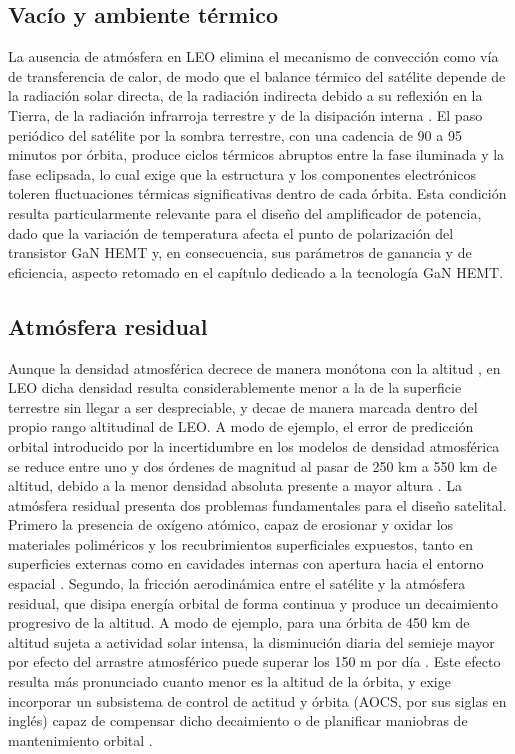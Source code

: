 \subsection{Vacío y ambiente térmico}
La ausencia de atmósfera en LEO elimina el mecanismo de convección como vía de transferencia de calor, de modo que el balance térmico del satélite depende de la radiación solar directa, de la radiación indirecta debido a su reflexión en la Tierra, de la radiación infrarroja terrestre y de la disipación interna \cite{gaite2007}. El paso periódico del satélite por la sombra terrestre, con una cadencia de 90 a 95 minutos por órbita, produce ciclos térmicos abruptos entre la fase iluminada y la fase eclipsada, lo cual exige que la estructura y los componentes electrónicos toleren fluctuaciones térmicas significativas dentro de cada órbita. Esta condición resulta particularmente relevante para el diseño del amplificador de potencia, dado que la variación de temperatura afecta el punto de polarización del transistor GaN HEMT y, en consecuencia, sus parámetros de ganancia y de eficiencia, aspecto retomado en el capítulo dedicado a la tecnología GaN HEMT.

\subsection{Atmósfera residual}
Aunque la densidad atmosférica decrece de manera monótona con la altitud \cite{benson2021}, en LEO dicha densidad resulta considerablemente menor a la de la superficie terrestre sin llegar a ser despreciable, y decae de manera marcada dentro del propio rango altitudinal de LEO. A modo de ejemplo, el error de predicción orbital introducido por la incertidumbre en los modelos de densidad atmosférica se reduce entre uno y dos órdenes de magnitud al pasar de 250 km a 550 km de altitud, debido a la menor densidad absoluta presente a mayor altura \cite{ray2022vleo}. La atmósfera residual presenta dos problemas fundamentales para el diseño satelital. Primero la presencia de oxígeno atómico, capaz de erosionar y oxidar los materiales poliméricos y los recubrimientos superficiales expuestos, tanto en superficies externas como en cavidades internas con apertura hacia el entorno espacial \cite{banks2003}. Segundo, la fricción aerodinámica entre el satélite y la atmósfera residual, que disipa energía orbital de forma continua y produce un decaimiento progresivo de la altitud. A modo de ejemplo, para una órbita de 450 km de altitud sujeta a actividad solar intensa, la disminución diaria del semieje mayor por efecto del arrastre atmosférico puede superar los 150 m por día \cite{thomassin2017}. Este efecto resulta más pronunciado cuanto menor es la altitud de la órbita, y exige incorporar un subsistema de control de actitud y órbita (AOCS, por sus siglas en inglés) capaz de compensar dicho decaimiento o de planificar maniobras de mantenimiento orbital \cite{thomassin2017}.

